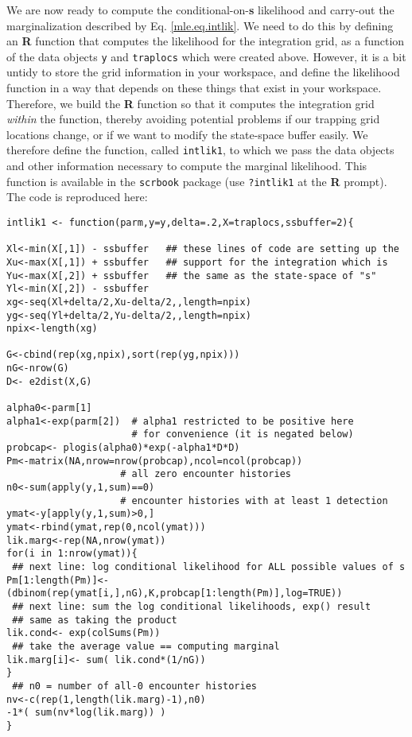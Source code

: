 We are now ready to  compute the conditional-on-{\bf s} likelihood and
carry-out the marginalization described by Eq. \ref{mle.eq.intlik}.
We need to do this by defining an {\bf R} function that computes the
likelihood for the integration grid, as a function of the data objects \mbox{\tt y} and
\mbox{\tt traplocs} which were created above. However,
it is a bit untidy to store the grid information in your workspace,
and define the likelihood function in a way that depends on these things that
exist in your workspace.  Therefore, we build the {\bf R} function so
that it computes the integration grid {\it within} the function, thereby
avoiding potential problems if our trapping grid locations change, or
if we want to modify the state-space buffer easily.  We therefore
define the function, called \mbox{\tt intlik1}, to which we pass the data
objects and other information necessary to compute the marginal
likelihood.  This function is available in the \mbox{\tt scrbook}
package (use {\tt ?intlik1} at the {\bf R} prompt).  The code is
reproduced here:

{\small 
\begin{verbatim}
intlik1 <- function(parm,y=y,delta=.2,X=traplocs,ssbuffer=2){

Xl<-min(X[,1]) - ssbuffer   ## these lines of code are setting up the 
Xu<-max(X[,1]) + ssbuffer   ## support for the integration which is
Yu<-max(X[,2]) + ssbuffer   ## the same as the state-space of "s"
Yl<-min(X[,2]) - ssbuffer
xg<-seq(Xl+delta/2,Xu-delta/2,,length=npix) 
yg<-seq(Yl+delta/2,Yu-delta/2,,length=npix) 
npix<-length(xg)

G<-cbind(rep(xg,npix),sort(rep(yg,npix)))
nG<-nrow(G)
D<- e2dist(X,G)  

alpha0<-parm[1]
alpha1<-exp(parm[2])  # alpha1 restricted to be positive here
                      # for convenience (it is negated below)
probcap<- plogis(alpha0)*exp(-alpha1*D*D)
Pm<-matrix(NA,nrow=nrow(probcap),ncol=ncol(probcap))
                    # all zero encounter histories
n0<-sum(apply(y,1,sum)==0) 
                    # encounter histories with at least 1 detection
ymat<-y[apply(y,1,sum)>0,] 
ymat<-rbind(ymat,rep(0,ncol(ymat)))
lik.marg<-rep(NA,nrow(ymat))
for(i in 1:nrow(ymat)){
 ## next line: log conditional likelihood for ALL possible values of s
Pm[1:length(Pm)]<- (dbinom(rep(ymat[i,],nG),K,probcap[1:length(Pm)],log=TRUE))
 ## next line: sum the log conditional likelihoods, exp() result
 ## same as taking the product
lik.cond<- exp(colSums(Pm))
 ## take the average value == computing marginal
lik.marg[i]<- sum( lik.cond*(1/nG))  
}
 ## n0 = number of all-0 encounter histories
nv<-c(rep(1,length(lik.marg)-1),n0)
-1*( sum(nv*log(lik.marg)) )
}
\end{verbatim}
}


